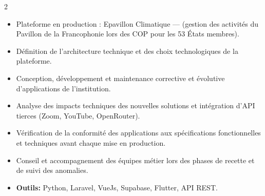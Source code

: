\documentclass[10pt,a4paper,ragged2e,withhyper]{altacv}
\begin{document}
\begin{paracol}{2}
            \begin{itemize}
                \item Plateforme en production : Epavillon Climatique —  (gestion des activités du Pavillon de la Francophonie lors des COP pour les 53 États membres).
                \item Définition de l'architecture technique et des choix technologiques de la plateforme.
                \item Conception, développement et maintenance corrective et évolutive d'applications de l'institution.
                \item Analyse des impacts techniques des nouvelles solutions et intégration d'API tierces (Zoom, YouTube, OpenRouter).
                \item Vérification de la conformité des applications aux spécifications fonctionnelles et techniques avant chaque mise en production.
                \item Conseil et accompagnement des équipes métier lors des phases de recette et de suivi des anomalies.
                \item \textcolor{SecondaryColor}{\textbf{Outils: }} Python, Laravel, VueJs, Supabase, Flutter, API REST.
            \end{itemize}
            \divider


\end{paracol}
\end{document}
